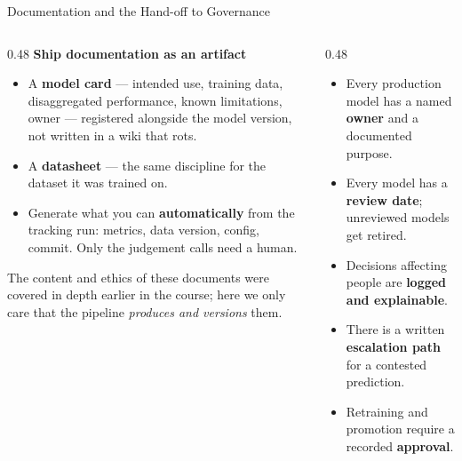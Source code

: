 \begin{frame}{Documentation and the Hand-off to Governance}

    \begin{columns}[T]
        \begin{column}{0.48\textwidth}
            \scriptsize
            \textbf{Ship documentation as an artifact}
            \begin{itemize}
                \item A \textbf{model card} --- intended use, training data, disaggregated performance,
                      known limitations, owner --- registered alongside the model version, not written in
                      a wiki that rots.
                \item A \textbf{datasheet} --- the same discipline for the dataset it was trained on.
                \item Generate what you can \textbf{automatically} from the tracking run: metrics, data
                      version, config, commit. Only the judgement calls need a human.
            \end{itemize}
            \vspace{0.09em}
            {\scriptsize The content and ethics of these documents were covered in depth earlier in the
            course; here we only care that the pipeline \emph{produces and versions} them.}
        \end{column}
        \begin{column}{0.48\textwidth}
            \begin{tcolorbox}[colback=blue!5, colframe=blue!50, title=\scriptsize A minimal governance checklist]
                \scriptsize
                \begin{itemize}
                    \item Every production model has a named \textbf{owner} and a documented purpose.
                    \item Every model has a \textbf{review date}; unreviewed models get retired.
                    \item Decisions affecting people are \textbf{logged and explainable}.
                    \item There is a written \textbf{escalation path} for a contested prediction.
                    \item Retraining and promotion require a recorded \textbf{approval}.
                \end{itemize}
            \end{tcolorbox}
        \end{column}
    \end{columns}


\end{frame}
